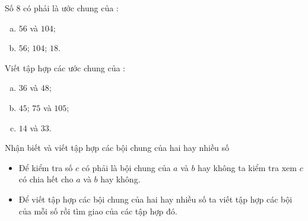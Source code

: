 \begin{vd}%
	Số $8$ có phải là ước chung của : 
	\begin{enumerate}[a)]
		\item $56$ và $104$;
		\item $56$; $104$; $18$.
	\end{enumerate}
\end{vd}
\begin{vd}%
	Viết tập hợp các ước chung của :
	\begin{enumerate}[a)]
		\item $36$ và $48$;
		\item $45$; $75$ và $105$;
		\item $14$ và $33$.
	\end{enumerate}
\end{vd}
\begin{dang}{Nhận biết và viết tập hợp các bội chung của hai hay nhiều số}
	\begin{itemize}
		\item Để kiểm tra số $c$ có phải là bội chung của $a$ và $b$ hay không ta kiểm tra xem $c$ có chia hết cho $a$ và $b$ hay không.
		\item Để viết tập hợp các bội chung của hai hay nhiều số ta viết tập hợp các bội của mỗi số rồi tìm giao của các tập hợp đó.
	\end{itemize}
\end{dang}
